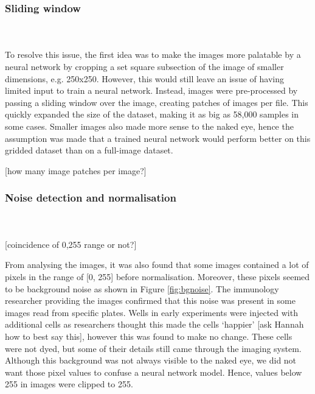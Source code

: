 \bigskip
\subsubsection{Sliding window}

\hfill\\
\hfill\\
To resolve this issue, the first idea was to make the images more palatable by a neural network by cropping a set square subsection of the image of smaller dimensions, e.g. 250x250. However, this would still leave an issue of having limited input to train a neural network. Instead, images were pre-processed by passing a sliding window over the image, creating patches of images per file. This quickly expanded the size of the dataset, making it as big as 58,000 samples in some cases. Smaller images also made more sense to the naked eye, hence the assumption was made that a trained neural network would perform better on this gridded dataset than on a full-image dataset.

[how many image patches per image?]

\bigskip
\subsubsection{Noise detection and normalisation}

\hfill\\
\hfill\\
[make sure to talk about things in logical order]

[coincidence of 0,255 range or not?]

From analysing the images, it was also found that some images contained a lot of pixels in the range of [0, 255] before normalisation. Moreover, these pixels seemed to be background noise as shown in Figure \ref{fig:bgnoise}. The immunology researcher providing the images confirmed that this noise was present in some images read from specific plates. Wells in early experiments were injected with additional cells as researchers thought this made the cells `happier' [ask Hannah how to best say this], however this was found to make no change. These cells were not dyed, but some of their details still came through the imaging system. Although this background was not always visible to the naked eye, we did not want those pixel values to confuse a neural network model. Hence, values below 255 in images were clipped to 255.

